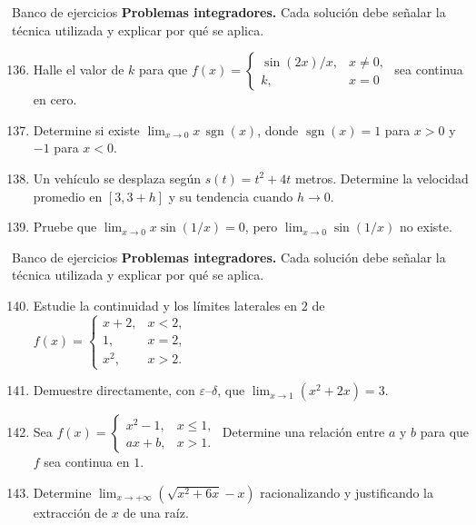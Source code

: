 \documentclass[12pt,aspectratio=169]{beamer}
\begin{document}
\begin{frame}[t,allowframebreaks]{Banco de ejercicios}
\small
\noindent \textbf{Problemas integradores.} Cada solución debe señalar la técnica utilizada y explicar por qué se aplica.\par\smallskip
\begin{enumerate}\setcounter{enumi}{135}
\item Halle el valor de $k$ para que $f(x)=\begin{cases}\sin(2x)/x,&x\ne0,\\k,&x=0\end{cases}$ sea continua en cero.
\item Determine si existe $\lim_{x\to0}x\,\operatorname{sgn}(x)$, donde $\operatorname{sgn}(x)=1$ para $x>0$ y $-1$ para $x<0$.
\item Un vehículo se desplaza según $s(t)=t^2+4t$ metros. Determine la velocidad promedio en $[3,3+h]$ y su tendencia cuando $h\to0$.
\item Pruebe que $\lim_{x\to0}x\sin(1/x)=0$, pero $\lim_{x\to0}\sin(1/x)$ no existe.
\end{enumerate}
\end{frame}


\begin{frame}[t,allowframebreaks]{Banco de ejercicios}
\small
\noindent \textbf{Problemas integradores.} Cada solución debe señalar la técnica utilizada y explicar por qué se aplica.\par\smallskip
\begin{enumerate}\setcounter{enumi}{139}
\item Estudie la continuidad y los límites laterales en $2$ de $f(x)=\begin{cases}x+2,&x<2,\\1,&x=2,\\x^2,&x>2.\end{cases}$
\item Demuestre directamente, con $\varepsilon$--$\delta$, que $\lim_{x\to1}(x^2+2x)=3$.
\item Sea $f(x)=\begin{cases}x^2-1,&x\le1,\\ax+b,&x>1.\end{cases}$ Determine una relación entre $a$ y $b$ para que $f$ sea continua en $1$.
\item Determine $\lim_{x\to+\infty}(\sqrt{x^2+6x}-x)$ racionalizando y justificando la extracción de $x$ de una raíz.
\end{enumerate}
\end{frame}
\end{document}
